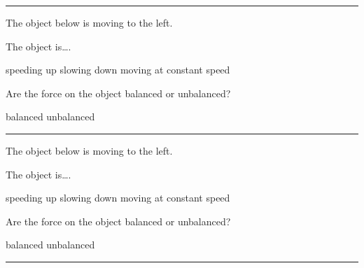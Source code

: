 \documentclass[../main-physics-problems.tex]{subfiles}
\begin{document}
\begin{questions}
\begin{multicols*}{2}
\bigskip
\hrule

\question \label{CrTRg}
The object below is moving to the left.


\begin{center}
\end{center}

The object is\dots .

\begin{randomizechoices}[norandomize]
    \choice speeding up
    \correctchoice slowing down
    \choice moving at constant speed 
\end{randomizechoices}

\question \label{TzyfS}
Are the force on the object balanced or unbalanced?

\begin{randomizechoices}[norandomize]
    \choice balanced
    \correctchoice unbalanced
\end{randomizechoices}

\bigskip
\hrule


\question \label{ayuwJ}
The object below is moving to the left.

\begin{center}
\end{center}

The object is\dots .

\begin{randomizechoices}[norandomize]
    \choice speeding up
    \choice slowing down
    \correctchoice moving at constant speed 
\end{randomizechoices}

\question \label{vYsXn}
Are the force on the object balanced or unbalanced?

\begin{randomizechoices}[norandomize]
    \correctchoice balanced
    \choice unbalanced
\end{randomizechoices}

\bigskip
\hrule




\end{multicols*}
\end{questions}
\end{document}
